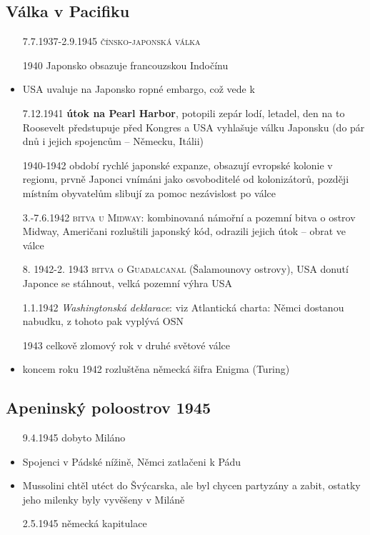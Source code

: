 \documentclass{article}
\begin{document}
\subsection*{Válka v Pacifiku}
\begin{itemize}
  \item[7.7.1937-2.9.1945] \textsc{čínsko-japonská válka}
  \item[1940] Japonsko obsazuje francouzskou Indočínu
  \item USA uvaluje na Japonsko ropné embargo, což vede k
  \item[7.12.1941] \textbf{útok na Pearl Harbor}, potopili zepár lodí, letadel, den na to Roosevelt předstupuje před Kongres a USA vyhlašuje válku Japonsku (do pár dnů i jejich spojencům -- Německu, Itálii)
  \item[1940-1942] období rychlé japonské expanze, obsazují evropské kolonie v regionu, prvně Japonci vnímáni jako osvoboditelé od kolonizátorů, později místním obyvatelům slibují za pomoc nezávislost po válce
  \item[3.-7.6.1942] \textsc{bitva u Midway}: kombinovaná námořní a pozemní bitva o ostrov Midway, Američani rozluštili japonský kód, odrazili jejich útok -- obrat ve válce
  \item[8. 1942-2. 1943] \textsc{bitva o Guadalcanal} (Šalamounovy ostrovy), USA donutí Japonce se stáhnout, velká pozemní výhra USA
  \item[1.1.1942] \textit{Washingtonská deklarace}: viz Atlantická charta: Němci dostanou nabudku, z tohoto pak vyplývá OSN
  \item[1943] celkově zlomový rok v druhé světové válce
  \item koncem roku 1942 rozluštěna německá šifra Enigma (Turing)
\end{itemize}

\subsection*{Apeninský poloostrov 1945}
\begin{itemize}
    \item[9.4.1945] dobyto Miláno
    \item Spojenci v Pádské nížině, Němci zatlačeni k Pádu
    \item Mussolini chtěl utéct do Švýcarska, ale byl chycen partyzány a zabit, ostatky jeho milenky byly vyvěšeny v Miláně
    \item[2.5.1945] německá kapitulace
\end{itemize}
\end{document}
